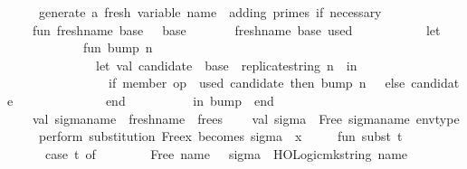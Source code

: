 \begin{isabellebody}
\isanewline
\ \ \ \ {\isacharparenleft}{\kern0pt}{\isacharasterisk}{\kern0pt}\ generate\ a\ fresh\ variable\ name\ {\isachardoublequote}{\kern0pt}{\isasymsigma}{\isachardoublequote}{\kern0pt}{\isacharcomma}{\kern0pt}\ adding\ primes\ if\ necessary\ {\isacharasterisk}{\kern0pt}{\isacharparenright}{\kern0pt}\isanewline
\ \ \ \ fun\ fresh{\isacharunderscore}{\kern0pt}name\ base\ {\isacharbrackleft}{\kern0pt}{\isacharbrackright}{\kern0pt}\ {\isacharequal}{\kern0pt}\ base\isanewline
\ \ \ \ \ \ {\isacharbar}{\kern0pt}\ fresh{\isacharunderscore}{\kern0pt}name\ base\ used\ {\isacharequal}{\kern0pt}\isanewline
\ \ \ \ \ \ \ \ \ \ let\isanewline
\ \ \ \ \ \ \ \ \ \ \ \ fun\ bump\ n\ {\isacharequal}{\kern0pt}\isanewline
\ \ \ \ \ \ \ \ \ \ \ \ \ \ let\ val\ candidate\ {\isacharequal}{\kern0pt}\ base\ {\isacharcircum}{\kern0pt}\ replicate{\isacharunderscore}{\kern0pt}string\ n\ {\isachardoublequote}{\kern0pt}{\isacharprime}{\kern0pt}{\isachardoublequote}{\kern0pt}\ in\isanewline
\ \ \ \ \ \ \ \ \ \ \ \ \ \ \ \ if\ member\ {\isacharparenleft}{\kern0pt}op\ {\isacharequal}{\kern0pt}{\isacharparenright}{\kern0pt}\ used\ candidate\ then\ bump\ {\isacharparenleft}{\kern0pt}n\ {\isacharplus}{\kern0pt}\ {}{\isacharparenright}{\kern0pt}\ else\ candidate\isanewline
\ \ \ \ \ \ \ \ \ \ \ \ \ \ end\isanewline
\ \ \ \ \ \ \ \ \ \ in\ bump\ {}\ end\isanewline
\isanewline
\ \ \ \ val\ sigma{\isacharunderscore}{\kern0pt}name\ {\isacharequal}{\kern0pt}\ fresh{\isacharunderscore}{\kern0pt}name\ {\isachardoublequote}{\kern0pt}{\isasymsigma}{\isachardoublequote}{\kern0pt}\ frees\isanewline
\ \ \ \ val\ sigma\ {\isacharequal}{\kern0pt}\ Free\ {\isacharparenleft}{\kern0pt}sigma{\isacharunderscore}{\kern0pt}name{\isacharcomma}{\kern0pt}\ env{\isacharunderscore}{\kern0pt}type{\isacharparenright}{\kern0pt}\isanewline
\isanewline
\ \ \ \ {\isacharparenleft}{\kern0pt}{\isacharasterisk}{\kern0pt}\ perform\ substitution{\isacharcolon}{\kern0pt}\ Free{\isacharparenleft}{\kern0pt}x{\isacharparenright}{\kern0pt}\ becomes\ sigma\ {\isachardollar}{\kern0pt}\ {\isachardoublequote}{\kern0pt}x{\isachardoublequote}{\kern0pt}\ {\isacharasterisk}{\kern0pt}{\isacharparenright}{\kern0pt}\isanewline
\ \ \ \ fun\ subst\ t\ {\isacharequal}{\kern0pt}\isanewline
\ \ \ \ \ \ case\ t\ of\isanewline
\ \ \ \ \ \ \ \ Free\ {\isacharparenleft}{\kern0pt}name{\isacharcomma}{\kern0pt}\ {\isacharunderscore}{\kern0pt}{\isacharparenright}{\kern0pt}\ {\isacharequal}{\kern0pt}{\isachargreater}{\kern0pt}\ sigma\ {\isachardollar}{\kern0pt}\ HOLogic{\isachardot}{\kern0pt}mk{\isacharunderscore}{\kern0pt}string\ name\isanewline

\end{isabellebody}
